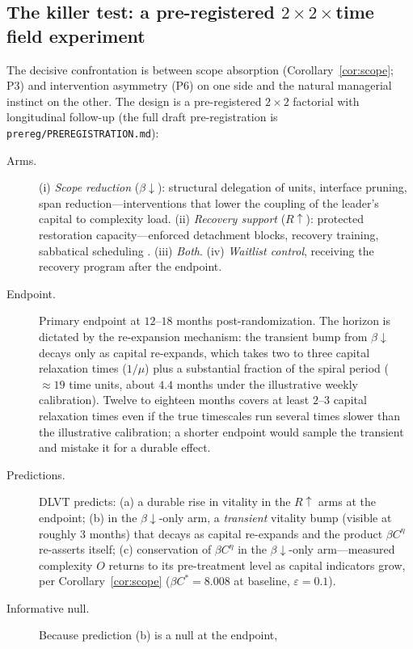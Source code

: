 \subsection{The killer test: a pre-registered $2\times2\times$time field
experiment}
\label{sec:emp-killer}

The decisive confrontation is between scope absorption
(Corollary~\ref{cor:scope}; P3) and intervention asymmetry (P6) on one
side and the natural managerial instinct on the other. The design is a
pre-registered $2\times2$ factorial with longitudinal follow-up
(the full draft pre-registration is \texttt{prereg/PREREGISTRATION.md}):

\begin{description}
\item[Arms.] (i) \emph{Scope reduction} ($\beta\downarrow$): structural
delegation of units, interface pruning, span reduction---interventions
that lower the coupling of the leader's capital to complexity load.
(ii) \emph{Recovery support} ($R\uparrow$): protected restoration
capacity---enforced detachment blocks, recovery training, sabbatical
scheduling \citep{sonnentag2007recovery,hahn2011recovery,
davidson2010sabbatical}.
(iii) \emph{Both}. (iv) \emph{Waitlist control}, receiving the recovery
program after the endpoint.
\item[Endpoint.] Primary endpoint at $12$--$18$ months post-randomization.
The horizon is dictated by the re-expansion mechanism: the transient bump
from $\beta\downarrow$ decays only as capital re-expands, which takes two
to three capital relaxation times ($1/\mu$) plus a substantial fraction of
the spiral period ($\approx19$ time units, about $4.4$ months under the
illustrative weekly calibration). Twelve to eighteen months covers at
least $2$--$3$ capital relaxation times even if the true timescales run
several times slower than the illustrative calibration; a shorter
endpoint would sample the transient and mistake it for a durable effect.
\item[Predictions.] DLVT predicts: (a) a durable rise in vitality in the
$R\uparrow$ arms at the endpoint; (b) in the $\beta\downarrow$-only arm, a
\emph{transient} vitality bump (visible at roughly $3$ months) that
decays as capital re-expands and the product $\beta C^{\eta}$
re-asserts itself; (c) conservation of $\beta C^{\eta}$ in the
$\beta\downarrow$-only arm---measured complexity $O$ returns to its
pre-treatment level as capital indicators grow, per
Corollary~\ref{cor:scope} ($\beta C^{*}=8.008$ at baseline,
$\varepsilon=0.1$).
\item[Informative null.] Because prediction (b) is a null at the endpoint,

\end{description}
